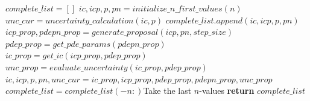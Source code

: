 \begin{Algorithmus}
    \caption{Pseudocode for PC-ULA}
    \label{alg:PC-ULA}
    \begin{algorithmic}[1] 
            \State $complete\_list = []$
            \State $ic, icp, p, pn = initialize\_n\_first\_values(n)$
            \State $unc\_cur = uncertainty\_calculation(ic, p)$
            \State $complete\_list.append(ic, icp, p, pn)$
            \State $icp\_prop, pdepn\_prop = generate\_proposal(icp, pn, step\_size)$
            \State $pdep\_prop = get\_pde\_params(pdepn\_prop)$
            \State $ic\_prop = get\_ic(icp\_prop, pdep\_prop)$
            \State $unc\_prop = evaluate\_uncertainty(ic\_prop, pdep\_prop)$
            \State $ic, icp, p, pn, unc\_cur = ic\_prop, icp\_prop, pdep\_prop,  pdepn\_prop, unc\_prop$
            \EndFor
        \State $complete\_list = complete\_list(-n:)$\Comment Take the last $n$-values
        \State \textbf{return } $complete\_list$
        \EndFunction
    \end{algorithmic}
\end{Algorithmus}











